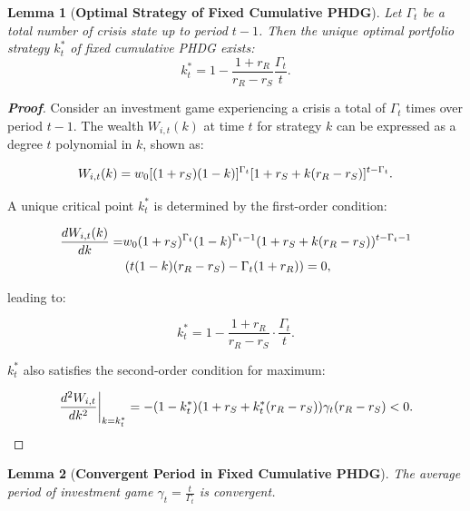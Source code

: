 \documentclass[11pt,a4paper]{article}
\newtheorem{lemma}{Lemma}
\begin{document}
\bigskip 
	\begin{lemma}[\textbf{Optimal Strategy of Fixed Cumulative PHDG}]
		\label{thm:k_t^ast} 
			Let $\Gamma_t$ be a total number of crisis state up to period $t-1$. Then the unique optimal portfolio strategy $k_t^\ast$ of fixed cumulative PHDG exists: 
			\[
				k_t^\ast = 1-\frac{1+r_R}{r_R-r_S}\frac{\Gamma_t}{t}.
			\]
	\end{lemma}

\smallskip
	\begin{proof}[\textbf{Proof}]
		
		Consider an investment game experiencing a crisis a total of \(\Gamma_t\) times over period \(t-1\). The wealth \(W_{i,t}(k)\) at time \(t\) for strategy \(k\) can be expressed as a degree \(t\) polynomial in \(k\), shown as:

		\begin{equation}
			W_{i,t}(k) = w_0  [(1+r_S)(1-k)]^{\Gamma_t} [1+r_S + k(r_R-r_S)]^{t-\Gamma_t}.\notag
		\end{equation}

		A unique critical point \(k_t^\ast\) is determined by the first-order condition:

		\begin{equation}%
			\begin{split}
				\frac{d W_{i,t}(k)}{d k} = &w_0(1+r_S)^{\Gamma_t}(1-k)^{\Gamma_t-1}(1+r_S+k(r_R-r_S))^{t-\Gamma_t-1}
				\\&\left(t(1-k)(r_R-r_S)-\Gamma_t(1+r_R)\right)=0,\notag
			\end{split}
		\end{equation}

		leading to:

		\begin{equation}\label{eq:opt}
			k_t^\ast = 1-\frac{1+r_R}{r_R-r_S}\cdot\frac{\Gamma_t}{t}.
		\end{equation}

		$k_t^\ast$ also satisfies the second-order condition for maximum:

		\begin{equation}
			\left.\frac{d^2 W_{i,t}}{dk^2}\right\vert_{k=k_t^\ast} = -(1-k_t^\ast)(1+r_S+k_t^\ast(r_R-r_S))\gamma_t(r_R-r_S) < 0. \notag
		\end{equation}
	\end{proof}

\bigskip
	\begin{lemma}[\textbf{Convergent Period in Fixed Cumulative PHDG}]\label{prop:convergent_period}
		The average period of investment game $\gamma_t = \frac{t}{\Gamma_t}$ is convergent.
	\end{lemma}
\end{document}

